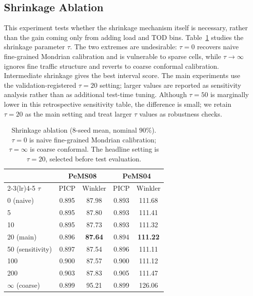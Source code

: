 \documentclass[letterpaper,journal]{IEEEtran}
\begin{document}
\subsection{Shrinkage Ablation}
This experiment tests whether the shrinkage mechanism itself is necessary, rather than the gain coming only from adding load and TOD bins. Table~\ref{tab:hlc_tau} studies the shrinkage parameter $\tau$. The two extremes are undesirable: $\tau=0$ recovers naive fine-grained Mondrian calibration and is vulnerable to sparse cells, while $\tau\rightarrow\infty$ ignores fine traffic structure and reverts to coarse conformal calibration. Intermediate shrinkage gives the best interval score. The main experiments use the validation-registered $\tau=20$ setting; larger values are reported as sensitivity analysis rather than as additional test-time tuning. Although $\tau=50$ is marginally lower in this retrospective sensitivity table, the difference is small; we retain $\tau=20$ as the main setting and treat larger $\tau$ values as robustness checks.

\begin{table}[t]
\centering
\caption{Shrinkage ablation (8-seed mean, nominal $90\%$). $\tau=0$ is naive fine-grained Mondrian calibration; $\tau=\infty$ is coarse conformal. The headline setting is $\tau=20$, selected before test evaluation.}
\label{tab:hlc_tau}
\footnotesize
\begin{tabular}{lcccc}
\toprule
 & \multicolumn{2}{c}{PeMS08} & \multicolumn{2}{c}{PeMS04} \\
\cmidrule(lr){2-3}\cmidrule(lr){4-5}
$\tau$ & PICP & Winkler & PICP & Winkler \\
\midrule
0 (naive)        & 0.895 & 87.98 & 0.893 & 111.68 \\
5                & 0.895 & 87.80 & 0.893 & 111.41 \\
10               & 0.895 & 87.73 & 0.893 & 111.32 \\
20 (main)        & 0.896 & \textbf{87.64} & 0.894 & \textbf{111.22} \\
50 (sensitivity) & 0.897 & 87.54 & 0.896 & 111.11 \\
100              & 0.900 & 87.57 & 0.900 & 111.12 \\
200              & 0.903 & 87.83 & 0.905 & 111.47 \\
$\infty$ (coarse)& 0.899 & 95.21 & 0.899 & 126.06 \\
\bottomrule
\end{tabular}
\end{table}
\end{document}
